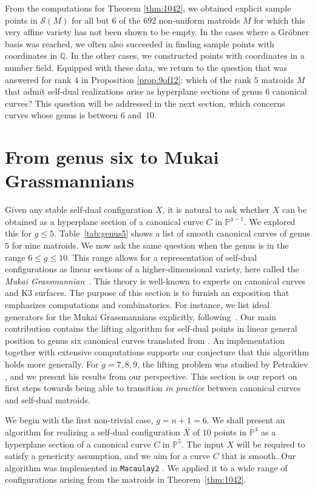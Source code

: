 \documentclass[12pt]{extarticle}
\theoremstyle{definition}
\numberwithin{theorem}{section}
\theoremstyle{plain}\newtheorem{ithm}{Theorem}
\newcommand{\PP}{\mathbb{P}}
\newcommand{\QQ}{\mathbb{Q}}
\begin{document}
From the computations for Theorem \ref{thm:1042},
we obtained explicit sample points in $\mathcal{S}(M)$
for all but $6$ of the $692$ non-uniform matroids $M$ for which this very affine variety has not been shown to be empty. In the cases where a Gr\"obner basis
was reached, we often also succeeded in finding sample points with coordinates in $\QQ$. In the other cases,
we constructed points with coordinates in a number field. 
Equipped with these data, we return to the question that was answered for rank $4$ in Proposition \ref{prop:9of12}:
which of the  rank $5$ matroids $M$ that admit self-dual realizations arise as hyperplane sections of
genus $6$ canonical curves? This question will be addressed in the next section, which 
concerns curves whose genus is between $6$ and~$10$.




\section{From genus six to Mukai Grassmannians}
\label{sec4}

Given any stable self-dual configuration $X$, it is natural to ask 
whether $X$ can be obtained as a hyperplane
section of a canonical curve $C$ in $\PP^{g-1}$. We explored this  for $g \leq 5$. Table~\ref{tab:genus5}
shows a list of smooth canonical curves of genus $5$ for
nine matroids.
 We now ask the same question when the genus is 
in the range $ 6 \leq g \leq 10$. 
This range allows for a representation of 
 self-dual configurations
 as linear sections of a  higher-dimensional variety, here called the
   {\em Mukai Grassmannian}~\cite{Kap2, Mukai, Mukai2}.
This theory is well-known to experts on canonical curves and K3 surfaces.
The purpose of this section is to furnish an exposition that emphasizes
computations and combinatorics.
 For instance, we list ideal generators for the 
Mukai Grassmannians explicitly, following~\cite{Kap1}.
Our main contribution contains the lifting algorithm for self-dual points in linear general position to genus six canonical curves translated from \cite{Bath}. An implementation together with extensive computations supports our conjecture that this algorithm holds more generally.
For $g = 7,8,9$, the lifting problem was studied by Petrakiev \cite{Pet}, 
and we present his results from our perspective.
This section is our report on 
first steps towards  being able to transition {\em in practice}
between  canonical curves and self-dual matroids.

We begin with the  first non-trivial case,  $g = n+1=6$.
We shall present an algorithm
for realizing a self-dual configuration $X$ of $10$ points in $\PP^4$ as a hyperplane
section of a canonical curve $C$ in $\PP^5$.
The input $X$ will be required to satisfy a 
genericity assumption, and we aim for a curve
$C$ that is smooth. Our algorithm was implemented in
{\tt Macaulay2} \cite{M2}.
We applied it to
a wide range of configurations arising from the matroids in
Theorem~\ref{thm:1042}.
\end{document}
